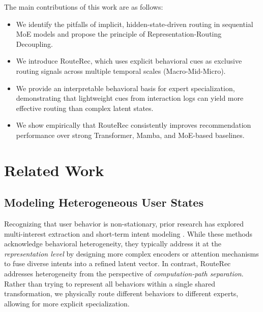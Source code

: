 \documentclass[sigconf,anonymous,review]{acmart-primary/acmart}
\begin{document}
The main contributions of this work are as follows:
\begin{itemize}
    \item We identify the pitfalls of implicit, hidden-state-driven routing in sequential MoE models and propose the principle of Representation-Routing Decoupling.
    \item We introduce RouteRec, which uses explicit behavioral cues as exclusive routing signals across multiple temporal scales (Macro-Mid-Micro).
    \item We provide an interpretable behavioral basis for expert specialization, demonstrating that lightweight cues from interaction logs can yield more effective routing than complex latent states.
    \item We show empirically that RouteRec consistently improves recommendation performance over strong Transformer, Mamba, and MoE-based baselines.
\end{itemize}

\section{Related Work}
\label{sec:related}

\subsection{Modeling Heterogeneous User States}
Recognizing that user behavior is non-stationary, prior research has explored multi-interest extraction \cite{li2019mind,cen2020comirec} and short-term intent modeling \cite{li2017narm,liu2018stamp}. While these methods acknowledge behavioral heterogeneity, they typically address it at the \textit{representation level} by designing more complex encoders or attention mechanisms to fuse diverse intents into a refined latent vector. In contrast, RouteRec addresses heterogeneity from the perspective of \textit{computation-path separation}. Rather than trying to represent all behaviors within a single shared transformation, we physically route different behaviors to different experts, allowing for more explicit specialization.
\end{document}
